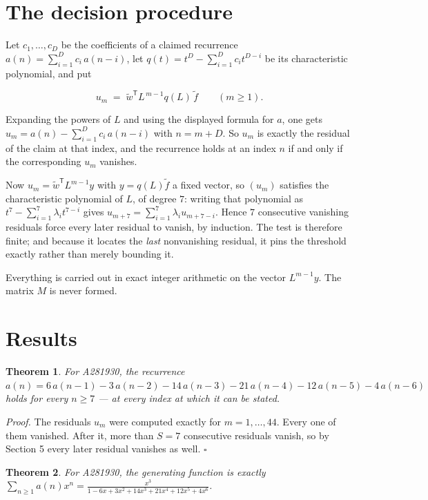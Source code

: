 \documentclass[11pt]{article}
\newtheorem{theorem}{Theorem}
\theoremstyle{definition}
\begin{document}
\section{The decision procedure}

Let $c_1,\dots,c_D$ be the coefficients of a claimed recurrence $a(n) = \sum_{i=1}^{D} c_i\,a(n-i)$, let $q(t) = t^{D} - \sum_{i=1}^{D} c_i t^{D-i}$ be its characteristic polynomial, and put

\[u_m \;=\; \tilde w^{\mathsf T} L^{\,m-1} q(L)\,\tilde f \qquad (m \ge 1).\]

Expanding the powers of $L$ and using the displayed formula for $a$, one gets $u_m = a(n) - \sum_{i=1}^{D} c_i\,a(n-i)$ with $n = m + D$. So $u_m$ is exactly the residual of the claim at that index, and the recurrence holds at an index $n$ if and only if the corresponding $u_m$ vanishes.

Now $u_m = \tilde w^{\mathsf T} L^{m-1} y$ with $y = q(L)\tilde f$ a fixed vector, so $(u_m)$ satisfies the characteristic polynomial of $L$, of degree $7$: writing that polynomial as $t^{7} - \sum_{i=1}^{7} \lambda_i t^{7-i}$ gives $u_{m+7} = \sum_{i=1}^{7} \lambda_i u_{m+7-i}$. Hence $7$ consecutive vanishing residuals force every later residual to vanish, by induction. The test is therefore finite; and because it locates the {\itshape last} nonvanishing residual, it pins the threshold exactly rather than merely bounding it.

Everything is carried out in exact integer arithmetic on the vector $L^{m-1}y$. The matrix $M$ is never formed.

\section{Results}

\begin{theorem} For A281930, the recurrence $a(n) = 6\,a(n-1) - 3\,a(n-2) - 14\,a(n-3) - 21\,a(n-4) - 12\,a(n-5) - 4\,a(n-6)$ holds for every $n \ge 7$ --- at every index at which it can be stated.\end{theorem}

{\itshape Proof.} The residuals $u_m$ were computed exactly for $m = 1,\dots,44$. Every one of them vanished. After it, more than $S = 7$ consecutive residuals vanish, so by Section 5 every later residual vanishes as well. $\square$

\begin{theorem} For A281930, the generating function is exactly $\sum_{n\ge 1} a(n)x^n = \frac{x^{3}}{1 - 6x + 3x^{2} + 14x^{3} + 21x^{4} + 12x^{5} + 4x^{6}}$.\end{theorem}
\end{document}
